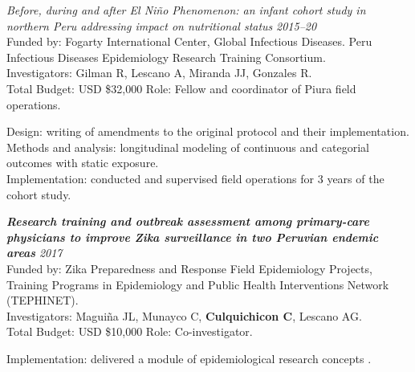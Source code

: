 \documentclass[10pt]{article}
\newenvironment{outerlist}[1][\enskip\textbullet]%
{\begin{itemize}[#1]}{\end{itemize}%
	\vspace{-0.6\baselineskip}}
\newenvironment{innerlist}[1][\enskip$\circ$]%
{\begin{compactitem}[#1]}{\end{compactitem}}
\begin{document}
\vspace{-0.05in}
\begin{outerlist}
	\item[] {\it Before, during and after El Niño Phenomenon: an infant cohort study in northern Peru addressing impact on nutritional status} \hfill {\it 2015--20}\\
	Funded by: Fogarty International Center, Global Infectious Diseases.
	Peru Infectious Diseases Epidemiology Research Training Consortium. \\
	Investigators: Gilman R, Lescano A, Miranda JJ, Gonzales R. \\
	Total Budget: USD \$32,000  \hfill Role: Fellow and coordinator of Piura field operations.
	
	\begin{innerlist}
		\item[] 	Design: writing of amendments to the original protocol and their implementation. \\
					Methods and analysis: longitudinal modeling of continuous and categorial outcomes with static exposure.\\
					Implementation: conducted and supervised field operations for 3 years of the cohort study.
	\end{innerlist}
	
\end{outerlist}

\vspace{-0.10in}
\begin{outerlist}
	\item[] \textbf{\emph{Research training and outbreak assessment among primary-care physicians to improve Zika surveillance in two Peruvian endemic areas}}  \hfill {\it 2017}\\
	Funded by: Zika Preparedness and Response Field Epidemiology Projects, Training Programs in Epidemiology and Public Health Interventions Network (TEPHINET). \\
	Investigators: Maguiña JL, Munayco C, {\bf Culquichicon C}, Lescano AG. \\
	Total Budget: USD \$10,000  \hfill Role: Co-investigator.
	
	\begin{innerlist}
	\item[] 	Implementation: delivered a module of epidemiological research concepts .
	\end{innerlist}

\end{outerlist}
\end{document}
